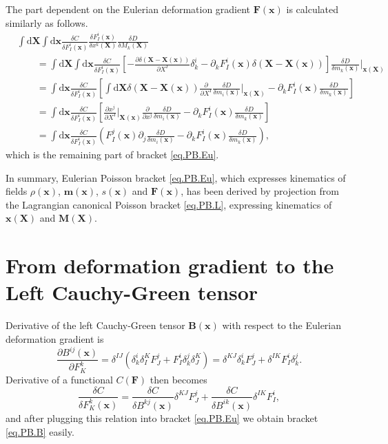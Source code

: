 \documentclass[
10pt, %
a4paper, %
oneside, %
headinclude,footinclude, %
BCOR5mm, %
]{scrartcl}
\newcommand{\xx}{\mathbf{x}}
\newcommand{\XX}{\mathbf{X}}
\newcommand{\dX}{\mathrm{d}\XX}
\newcommand{\dx}{\mathrm{d}\xx}
\newcommand{\mm}{\mathbf{m}}
\newcommand{\MM}{\mathbf{M}}
\newcommand{\FF}{\mathbf{F}}
\newcommand{\BB}{\mathbf{B}}
\begin{document}
The part dependent on the Eulerian deformation gradient $\FF(\xx)$ is calculated similarly as follows.
\begin{align}
	&\int\dX \int\dx \frac{\delta C}{\delta F^i_I(\xx)} \frac{\delta F^i_I(\xx)}{\delta x^k(\XX)} \frac{\delta D}{\delta M_k(\XX)}\nonumber\\
	&\qquad=\int\dX \int\dx \frac{\delta C}{\delta F^i_I(\xx)}\left[
	- \frac{\partial \delta(\XX-\XX(\xx))}{\partial X^I}\delta^i_k
	-\partial_k F^i_I(\xx)\delta(\XX-\XX(\xx))\right]\frac{\delta D}{\delta m_k(\xx)}\Big|_{\xx(\XX)}\nonumber\\
&\qquad=\int\dx  \frac{\delta C}{\delta F^i_I(\xx)}\left[
	\int\dX \delta(\XX-\XX(\xx)) \frac{\partial}{\partial X^I}\frac{\delta D}{\delta m_i(\xx)}\Big|_{\xx(\XX)}
	-\partial_k F^i_I(\xx)\frac{\delta D}{\delta m_k(\xx)}\right]\nonumber\\
&\qquad=\int\dx  \frac{\delta C}{\delta F^i_I(\xx)}\left[
	\frac{\partial x^j}{\partial X^I}\Big|_{\XX(\xx)}\frac{\partial}{\partial x^j}\frac{\delta D}{\delta m_i(\xx)}
	-\partial_k F^i_I(\xx)\frac{\delta D}{\delta m_k(\xx)}\right]\nonumber\\
&\qquad=\int\dx  \frac{\delta C}{\delta F^i_I(\xx)}\left(F^j_I(\xx)\partial_j \frac{\delta D}{\delta m_i(\xx)}
	-\partial_k F^i_I(\xx)\frac{\delta D}{\delta m_k(\xx)}\right),
\end{align}
which is the remaining part of bracket \eqref{eq.PB.Eu}. 

In summary, Eulerian Poisson bracket \eqref{eq.PB.Eu}, which expresses kinematics of fields $\rho(\xx)$, $\mm(\xx)$, $s(\xx)$ and $\FF(\xx)$, has been derived by projection from the Lagrangian canonical Poisson bracket \eqref{eq.PB.L}, expressing kinematics of $\xx(\XX)$ and $\MM(\XX)$.



\section{From deformation gradient to the Left Cauchy-Green tensor}\label{sec.F-B}
Derivative of the left Cauchy-Green tensor $\BB(\xx)$ with respect to the Eulerian deformation gradient is
\begin{equation}
	\frac{\partial B^{ij}(\xx)}{\partial F^k_K} = \delta^{IJ}(\delta^i_k \delta^K_I F^j_J +  F^i_I \delta^j_k \delta^K_J)
	= \delta^{KJ}\delta^i_k F^j_J +  \delta^{IK} F^i_I \delta^j_k.
\end{equation}
Derivative of a functional $C(\FF)$ then becomes
\begin{equation}
	\frac{\delta C}{\delta F^k_K(\xx)} = 
	\frac{\delta C}{\delta B^{kj}(\xx)}\delta^{KJ} F^j_J +  \frac{\delta C}{\delta B^{ik}(\xx)}\delta^{IK} F^i_I,
\end{equation}
and after plugging this relation into bracket \eqref{eq.PB.Eu} we obtain bracket \eqref{eq.PB.B} easily.
\end{document}
